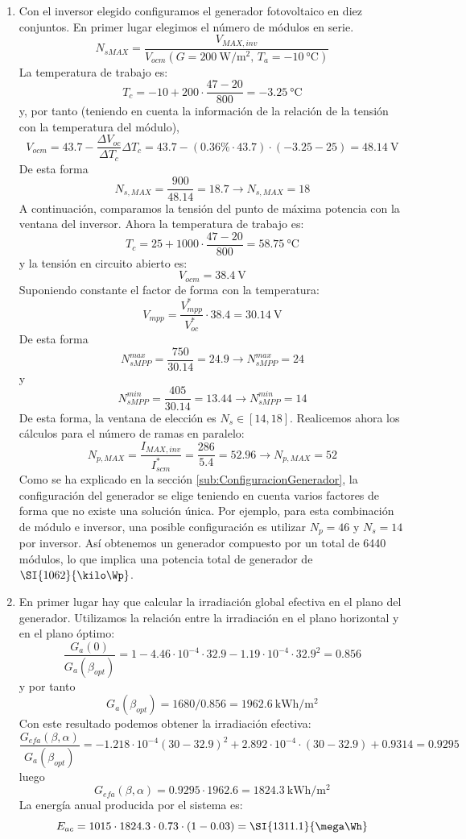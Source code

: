 \begin{enumerate}
\begin{enumerate}
\item Con el inversor elegido configuramos el generador fotovoltaico en
diez conjuntos. En primer lugar elegimos el número de módulos en serie.
\[
N_{sMAX}=\frac{V_{MAX,inv}}{V_{ocm}(G=\SI{200}{\watt\per\meter\squared},\, T_{a}=\SI{-10}{\celsius})}\]
La temperatura de trabajo es: \[
T_{c}=-10+200\cdot\frac{47-20}{800}=\SI{-3.25}{\celsius}\]
y, por tanto (teniendo en cuenta la información de la relación de
la tensión con la temperatura del módulo), \[
V_{ocm}=43.7-\frac{\Delta V_{oc}}{\Delta T_{c}}\Delta T_{c}=43.7-(0.36\%\cdot43.7)\cdot(-3.25-25)=\SI{48.14}{\volt}\]
De esta forma\[
N_{s,MAX}=\frac{900}{48.14}=18.7\rightarrow N_{s,MAX}=18\]
A continuación, comparamos la tensión del punto de máxima potencia
con la ventana del inversor. Ahora la temperatura de trabajo es:\[
T_{c}=25+1000\cdot\frac{47-20}{800}=\SI{58.75}{\celsius}\]
y la tensión en circuito abierto es:\[
V_{ocm}=\SI{38.4}{\volt}\]
Suponiendo constante el factor de forma con la temperatura:\[
V_{mpp}=\frac{V_{mpp}^{*}}{V_{oc}^{*}}\cdot38.4=\SI{30.14}{\volt}\]
De esta forma \[
N_{sMPP}^{max}=\frac{750}{30.14}=24.9\rightarrow N_{sMPP}^{max}=24\]
y\[
N_{sMPP}^{min}=\frac{405}{30.14}=13.44\rightarrow N_{sMPP}^{min}=14\]
De esta forma, la ventana de elección es $N_{s}\in\left[14,18\right]$.
Realicemos ahora los cálculos para el número de ramas en paralelo:
\[
N_{p,MAX}=\frac{I_{MAX,inv}}{I_{scm}^{*}}=\frac{286}{5.4}=52.96\rightarrow N_{p,MAX}=52\]
Como se ha explicado en la sección \ref{sub:ConfiguracionGenerador},
la configuración del generador se elige teniendo en cuenta varios
factores de forma que no existe una solución única. Por ejemplo, para
esta combinación de módulo e inversor, una posible configuración es
utilizar $N_{p}=46$ y $N_{s}=14$ por inversor. Así obtenemos un
generador compuesto por un total de 6440 módulos, lo que implica una
potencia total de generador de $\SI{1062}{\kilo\Wp}$.
\item En primer lugar hay que calcular la irradiación global efectiva en
el plano del generador. Utilizamos la relación entre la irradiación
en el plano horizontal y en el plano óptimo:\[
\frac{G_{a}(0)}{G_{a}(\beta_{opt})}=1-4.46\cdot10^{-4}\cdot32.9-1.19\cdot10^{-4}\cdot32.9^{2}=0.856\]
y por tanto\[
G_{a}(\beta_{opt})=1680/0.856=\SI{1962.6}{\kWh\per\meter\squared}\]
Con este resultado podemos obtener la irradiación efectiva:\[
\frac{G_{efa}(\beta,\alpha)}{G_{a}(\beta_{opt})}=-1.218\cdot10^{-4}(30-32.9)^{2}+2.892\cdot10^{-4}\cdot(30-32.9)+0.9314=0.9295\]
luego\[
G_{efa}(\beta,\alpha)=0.9295\cdot1962.6=\SI{1824.3}{\kWh\per\meter\squared}\]
La energía anual producida por el sistema es:\[
E_{ac}=1015\cdot1824.3\cdot0.73\cdot(1-0.03)=\SI{1311.1}{\mega\Wh}\]

\end{enumerate}
\end{enumerate}

